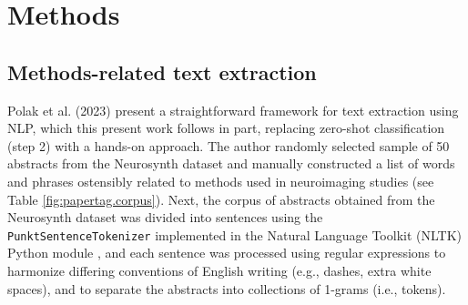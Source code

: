 
\section{Methods}
\label{sec:papertag.methods}

\subsection{Methods-related text extraction}

Polak et al. (2023) \cite{PolakEtAl2023} present a straightforward framework for text extraction using NLP, which this present work follows in part, replacing zero-shot classification (step 2) with a hands-on approach. The author randomly selected sample of 50 abstracts from the Neurosynth dataset and manually constructed a list of words and phrases ostensibly related to methods used in neuroimaging studies (see Table \ref{fig:papertag.corpus}). Next, the corpus of abstracts obtained from the Neurosynth dataset was divided into sentences using the \texttt{PunktSentenceTokenizer} \cite{KissStrunk2006} implemented in the Natural Language Toolkit (NLTK) Python module \cite{BirdEtAl2009}, and each sentence was processed using regular expressions to harmonize differing conventions of English writing (e.g., dashes, extra white spaces), and to separate the abstracts into collections of 1-grams (i.e., tokens). 




